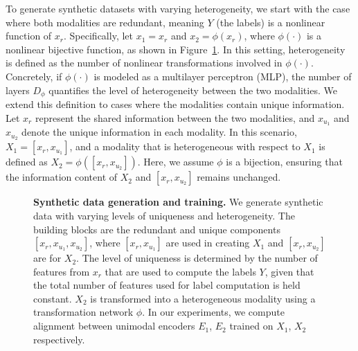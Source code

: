 To generate synthetic datasets with varying heterogeneity, we start with the case where both modalities are redundant, meaning \(Y\) (the labels) is a nonlinear function of \(x_r\). Specifically, let \(x_1 = x_r\) and \(x_2 = \phi(x_r)\), where \(\phi(\cdot)\) is a nonlinear bijective function, as shown in Figure~\ref{fig:data_generation}. 
In this setting, heterogeneity is defined as the number of nonlinear transformations involved in \(\phi(\cdot)\). Concretely, if \(\phi(\cdot)\) is modeled as a multilayer perceptron (MLP), the number of layers \(D_{\phi}\) quantifies the level of heterogeneity between the two modalities. We extend this definition to cases where the modalities contain unique information. Let \(x_r\) represent the shared information between the two modalities, and \(x_{u_1}\) and \(x_{u_2}\) denote the unique information in each modality. In this scenario, \(X_1 = [x_r, x_{u_1}]\), and a modality that is heterogeneous with respect to \(X_1\) is defined as \(X_2 = \phi([x_r, x_{u_2}])\). Here, we assume \(\phi\) is a bijection, ensuring that the information content of \(X_2\) and \([x_r, x_{u_2}]\) remains unchanged. 

\begin{figure}[t!]
    \caption{\textbf{Synthetic data generation and training.} We generate synthetic data with varying levels of uniqueness and heterogeneity. The building blocks are the redundant and unique components \([x_r, x_{u_1}, x_{u_2}]\), where $[x_r, x_{u_1}]$ are used in creating $X_1$ and \([x_r, x_{u_2}]\) are for \(X_2\). The level of uniqueness is determined by the number of features from $x_r$ that are used to compute the labels $Y$, given that the total number of features used for label computation is held constant. $X_2$ is transformed into a heterogeneous modality using a transformation network $\phi$.  In our experiments, we compute alignment between unimodal encoders $E_1$, $E_2$ trained on $X_1$, $X_2$ respectively. 
    \vspace{-0.5em}
    }
    \label{fig:data_generation}
\end{figure}



